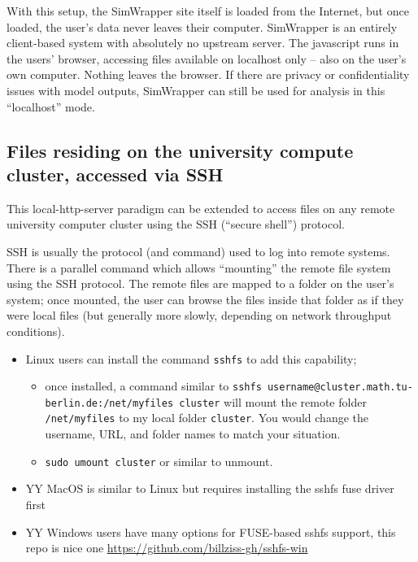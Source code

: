 With this setup, the SimWrapper site itself is loaded from the Internet,
but once loaded, the user's data never leaves their computer. SimWrapper
is an entirely client-based system with absolutely no upstream server.
The javascript runs in the users' browser, accessing files available on
localhost only -- also on the user's own computer. Nothing leaves the
browser. If there are privacy or confidentiality issues with model
outputs, SimWrapper can still be used for analysis in this ``localhost''
mode.

\hypertarget{files-residing-on-the-university-compute-cluster-accessed-via-ssh}{%
\subsection{Files residing on the university compute cluster, accessed
via
SSH}\label{files-residing-on-the-university-compute-cluster-accessed-via-ssh}}

This local-http-server paradigm can be extended to access files on any
remote university computer cluster using the SSH (``secure shell'')
protocol.

SSH is usually the protocol (and command) used to log into remote
systems. There is a parallel command which allows ``mounting'' the
remote file system using the SSH protocol. The remote files are mapped
to a folder on the user's system; once mounted, the user can browse the
files inside that folder as if they were local files (but generally more
slowly, depending on network throughput conditions).

\begin{itemize}
\item
  Linux users can install the command \texttt{sshfs} to add this
  capability;

  \begin{itemize}
  \item
    once installed, a command similar to
    \texttt{sshfs\ username@cluster.math.tu-berlin.de:/net/myfiles\ cluster}
    will mount the remote folder \texttt{/net/myfiles} to my local
    folder \texttt{cluster}. You would change the username, URL, and
    folder names to match your situation.
  \item
    \texttt{sudo\ umount\ cluster} or similar to unmount.
  \end{itemize}
\item
  YY MacOS is similar to Linux but requires installing the sshfs fuse
  driver first
\item
  YY Windows users have many options for FUSE-based sshfs support, this
  repo is nice one \url{https://github.com/billziss-gh/sshfs-win}
\end{itemize}

